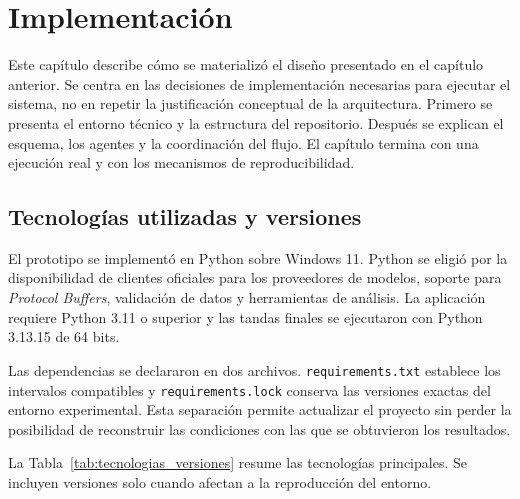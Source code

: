 \chapter{Implementación}
\label{cap:implementacion}

Este capítulo describe cómo se materializó el diseño presentado en el capítulo anterior. Se centra en las decisiones de implementación necesarias para ejecutar el sistema, no en repetir la justificación conceptual de la arquitectura. Primero se presenta el entorno técnico y la estructura del repositorio. Después se explican el esquema, los agentes y la coordinación del flujo. El capítulo termina con una ejecución real y con los mecanismos de reproducibilidad.

\section{Tecnologías utilizadas y versiones}
\label{sec:tecnologias_versiones}

El prototipo se implementó en Python sobre Windows 11. Python se eligió por la disponibilidad de clientes oficiales para los proveedores de modelos, soporte para \textit{Protocol Buffers}, validación de datos y herramientas de análisis. La aplicación requiere Python 3.11 o superior y las tandas finales se ejecutaron con Python 3.13.15 de 64 bits.

Las dependencias se declararon en dos archivos. \texttt{requirements.txt} establece los intervalos compatibles y \texttt{requirements.lock} conserva las versiones exactas del entorno experimental. Esta separación permite actualizar el proyecto sin perder la posibilidad de reconstruir las condiciones con las que se obtuvieron los resultados.

La Tabla~\ref{tab:tecnologias_versiones} resume las tecnologías principales. Se incluyen versiones solo cuando afectan a la reproducción del entorno.

